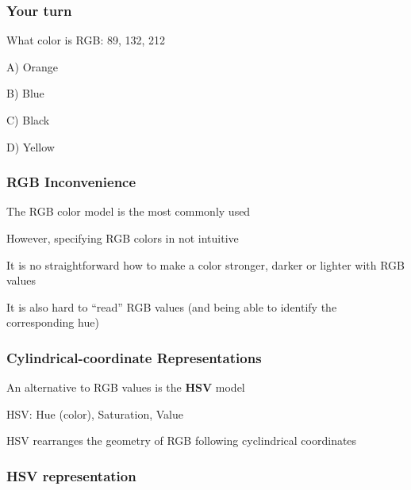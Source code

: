 \documentclass[12pt]{beamer}\usepackage[]{graphicx}\usepackage[]{color}
\begin{document}

\begin{frame}
\frametitle{Your turn}

{\large What color is RGB: 89, 132, 212}
\bbi
  \item[A)] {\hilit Orange}
  \item[B)] {\mdlit Blue}
  \item[C)] Black
  \item[D)] {\lit Yellow}
\ei

\end{frame}


\begin{frame}
\frametitle{RGB Inconvenience}

 \bi
  \item The RGB color model is the most commonly used
  \item However, specifying RGB colors in not intuitive
  \item It is no straightforward how to make a color stronger, darker or lighter with RGB values
  \item It is also hard to ``read'' RGB values (and being able to identify the corresponding hue)
 \ei
\eb

\end{frame}


\begin{frame}
\frametitle{Cylindrical-coordinate Representations}

 \bi
  \item An alternative to RGB values is the \textbf{HSV} model
  \item HSV: Hue (color), Saturation, Value
  \item HSV rearranges the geometry of RGB following cyclindrical coordinates
 \ei
\eb

\end{frame}


\begin{frame}
\frametitle{HSV representation}
\begin{center}
\end{center}
\end{frame}
\end{document}
